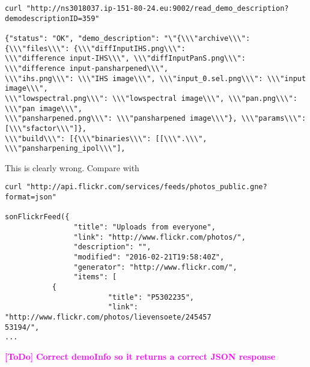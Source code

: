 \documentclass[a4paper,12pt]{article}
\newcommand{\ToDo}[1]{\textcolor{magenta}{\textbf{[ToDo]} \textbf{#1}}}
\begin{document}
\begin{verbatim}
curl "http://ns3018037.ip-151-80-24.eu:9002/read_demo_description?demodescriptionID=359"

{"status": "OK", "demo_description": "\"{\\\"archive\\\": {\\\"files\\\": {\\\"diffInputIHS.png\\\":
\\\"difference input-IHS\\\", \\\"diffInputPanS.png\\\": \\\"difference input-pansharpened\\\",
\\\"ihs.png\\\": \\\"IHS image\\\", \\\"input_0.sel.png\\\": \\\"input image\\\",
\\\"lowspectral.png\\\": \\\"lowspectral image\\\", \\\"pan.png\\\": \\\"pan image\\\",
\\\"pansharpened.png\\\": \\\"pansharpened image\\\"}, \\\"params\\\": [\\\"sfactor\\\"]},
\\\"build\\\": [{\\\"binaries\\\": [[\\\".\\\", \\\"pansharpening_ipol\\\"],
\end{verbatim}

This is clearly wrong. Compare with
\begin{verbatim}
curl "http://api.flickr.com/services/feeds/photos_public.gne?format=json"

sonFlickrFeed({
                "title": "Uploads from everyone",
                "link": "http://www.flickr.com/photos/",
                "description": "",
                "modified": "2016-02-21T19:58:40Z",
                "generator": "http://www.flickr.com/",
                "items": [
           {
                        "title": "P5302235",
                        "link": "http://www.flickr.com/photos/lievensoete/245457
53194/",
...
\end{verbatim}
\ToDo{Correct demoInfo so it returns a correct JSON response}
\end{document}

